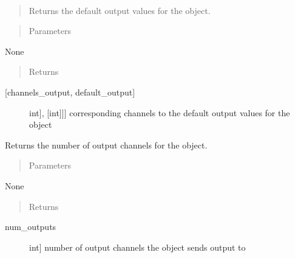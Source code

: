 \documentclass[letterpaper,10pt,english]{sphinxmanual}
\begin{document}
\begin{fulllineitems}
\begin{fulllineitems}
\label{\detokenize{base:MultiInputOutputObject.MultiInputOutputObject.get_default_outputs}}~\begin{quote}

\sphinxAtStartPar
Returns the default output values for the object.
\end{quote}
\begin{quote}\begin{description}
\item[{Parameters}] \leavevmode
\end{description}\end{quote}

\sphinxAtStartPar
None
\begin{quote}\begin{description}
\item[{Returns}] \leavevmode
\end{description}\end{quote}
\begin{description}
\item[{{[}channels\_output, default\_output{]}}] \leavevmode{[}{[}{[}int{]}, {[}int{]}{]}{]}
\sphinxAtStartPar
corresponding channels to the default output values for the object

\end{description}

\end{fulllineitems}


\begin{fulllineitems}
\label{\detokenize{base:MultiInputOutputObject.MultiInputOutputObject.get_num_channels}}
\sphinxAtStartPar
Returns the number of output channels for the object.
\begin{quote}\begin{description}
\item[{Parameters}] \leavevmode
\end{description}\end{quote}

\sphinxAtStartPar
None
\begin{quote}\begin{description}
\item[{Returns}] \leavevmode
\end{description}\end{quote}
\begin{description}
\item[{num\_outputs}] \leavevmode{[}int{]}
\sphinxAtStartPar
number of output channels the object sends output to


\end{description}
\end{fulllineitems}
\end{fulllineitems}
\end{document}
